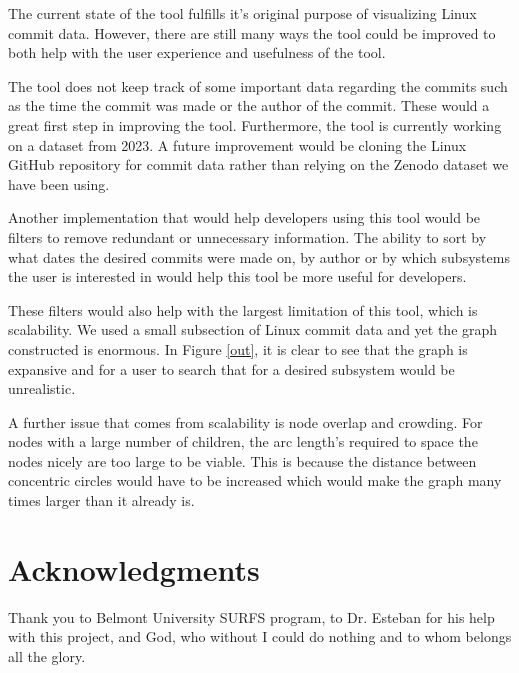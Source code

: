 \documentclass[conference]{IEEEtran}
\begin{document}
The current state of the tool fulfills it's original purpose of visualizing Linux commit data. However, there are still many ways the tool could be improved to both help with the user experience and usefulness of the tool.

The tool does not keep track of some important data regarding the commits such as the time the commit was made or the author of the commit. These would a great first step in improving the tool. Furthermore, the tool is currently working on a dataset from 2023. A future improvement would be cloning the Linux GitHub repository for commit data rather than relying on the Zenodo dataset \cite{zenodo} we have been using.

Another implementation that would help developers using this tool would be filters to remove redundant or unnecessary information. The ability to sort by what dates the desired commits were made on, by author or by which subsystems the user is interested in would help this tool be more useful for developers. 

These filters would also help with the largest limitation of this tool, which is scalability. We used a small subsection of Linux commit data and yet the graph constructed is enormous. In Figure \ref{out}, it is clear to see that the graph is expansive and for a user to search that for a desired subsystem would be unrealistic. 

A further issue that comes from scalability is node overlap and crowding. For nodes with a large number of children, the arc length's required to space the nodes nicely are too large to be viable. This is because the distance between concentric circles would have to be increased which would make the graph many times larger than it already is.




\section*{Acknowledgments}
Thank you to Belmont University SURFS program, to Dr. Esteban for his help with this project, and God, who without I could do nothing and to whom belongs all the glory.







\vspace{12pt}
\end{document}

